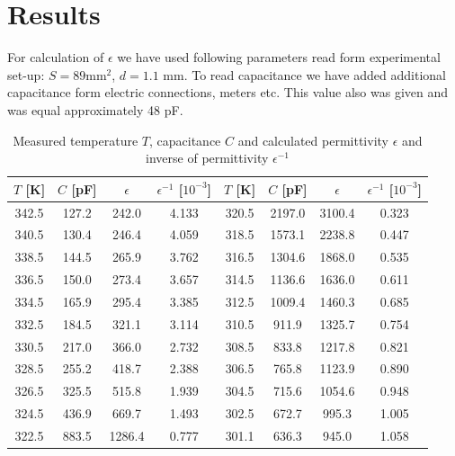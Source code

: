 \documentclass[a4paper,12pt]{article}
\begin{document}
    \section{Results}

    For calculation of $\epsilon$ we have used following parameters read form experimental set-up: $S = 89 \mathrm{mm}^2$, $d = 1.1$ mm. To read capacitance we have added additional capacitance form electric connections, meters etc. This value also was given and was equal approximately 48 pF.  


    \begin{table}[H]
        \begin{center}
            \caption{Measured temperature $T$, capacitance $C$ and calculated permittivity $\epsilon$ and inverse of permittivity $\epsilon^{-1}$}
            \label{tab:vn}
    
            \begin{tabular}{|c|c|c|c||c|c|c|c|}
                \hline
                $T$ [K] & $C$ [pF] & $\epsilon$ & $\epsilon^{-1}$ [$10^{-3}$] &
                $T$ [K] & $C$ [pF] & $\epsilon$ & $\epsilon^{-1}$ [$10^{-3}$] 
                \\ \hline
342.5 & 127.2 & 242.0 & 4.133 & 320.5 & 2197.0 & 3100.4 & 0.323\\
340.5 & 130.4 & 246.4 & 4.059 & 318.5 & 1573.1 & 2238.8 & 0.447\\
338.5 & 144.5 & 265.9 & 3.762 & 316.5 & 1304.6 & 1868.0 & 0.535\\
336.5 & 150.0 & 273.4 & 3.657 & 314.5 & 1136.6 & 1636.0 & 0.611\\
334.5 & 165.9 & 295.4 & 3.385 & 312.5 & 1009.4 & 1460.3 & 0.685\\
332.5 & 184.5 & 321.1 & 3.114 & 310.5 & 911.9 & 1325.7 & 0.754\\
330.5 & 217.0 & 366.0 & 2.732 & 308.5 & 833.8 & 1217.8 & 0.821\\
328.5 & 255.2 & 418.7 & 2.388 & 306.5 & 765.8 & 1123.9 & 0.890\\
326.5 & 325.5 & 515.8 & 1.939 & 304.5 & 715.6 & 1054.6 & 0.948\\
324.5 & 436.9 & 669.7 & 1.493 & 302.5 & 672.7 & 995.3 & 1.005\\
322.5 & 883.5 & 1286.4 & 0.777 & 301.1 & 636.3 & 945.0 & 1.058\\
                \hline
            \end{tabular}
        \end{center}
    \end{table}
\end{document}
